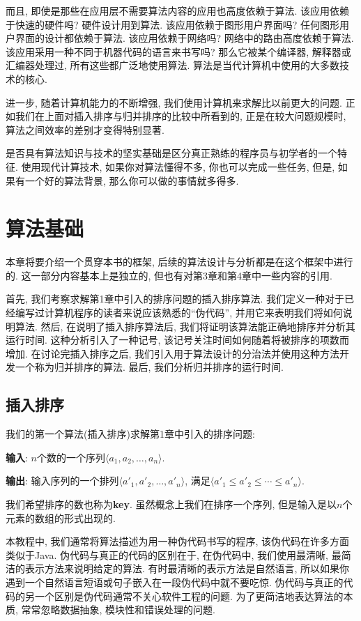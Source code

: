 \documentclass[oneside,10pt]{ctexbook}
\begin{document}
而且, 即使是那些在应用层不需要算法内容的应用也高度依赖于算法. 该应用依赖于快速的硬件吗? 硬件设计用到算法. 该应用依赖于图形用户界面吗? 任何图形用户界面的设计都依赖于算法. 该应用依赖于网络吗? 网络中的路由高度依赖于算法. 该应用采用一种不同于机器代码的语言来书写吗? 那么它被某个编译器, 解释器或汇编器处理过, 所有这些都广泛地使用算法. 算法是当代计算机中使用的大多数技术的核心.

进一步, 随着计算机能力的不断增强, 我们使用计算机来求解比以前更大的问题. 正如我们在上面对插入排序与归并排序的比较中所看到的, 正是在较大问题规模时, 算法之间效率的差别才变得特别显著.

是否具有算法知识与技术的坚实基础是区分真正熟练的程序员与初学者的一个特征. 使用现代计算技术, 如果你对算法懂得不多, 你也可以完成一些任务, 但是, 如果有一个好的算法背景, 那么你可以做的事情就多得多.

\chapter{算法基础}

本章将要介绍一个贯穿本书的框架, 后续的算法设计与分析都是在这个框架中进行的. 这一部分内容基本上是独立的, 但也有对第3章和第4章中一些内容的引用.

首先, 我们考察求解第1章中引入的排序问题的插入排序算法. 我们定义一种对于已经编写过计算机程序的读者来说应该熟悉的``伪代码'', 并用它来表明我们将如何说明算法. 然后, 在说明了插入排序算法后, 我们将证明该算法能正确地排序并分析其运行时间. 这种分析引入了一种记号, 该记号关注时间如何随着将被排序的项数而增加. 在讨论完插入排序之后, 我们引入用于算法设计的分治法并使用这种方法开发一个称为归并排序的算法. 最后, 我们分析归并排序的运行时间.

\section{插入排序}

我们的第一个算法(插入排序)求解第1章中引入的排序问题:

\textbf{输入}: $n$个数的一个序列$\langle a_1, a_2, \dots, a_n\rangle$.

\textbf{输出}: 输入序列的一个排列$\langle a'_1, a'_2, \dots, a'_n\rangle$, 满足$\langle a'_1\leq a'_2\leq\cdots\leq a'_n\rangle$.

我们希望排序的数也称为\textbf{key}. 虽然概念上我们在排序一个序列, 但是输入是以$n$个元素的数组的形式出现的.

本教程中, 我们通常将算法描述为用一种伪代码书写的程序, 该伪代码在许多方面类似于Java. 伪代码与真正的代码的区别在于, 在伪代码中, 我们使用最清晰, 最简洁的表示方法来说明给定的算法. 有时最清晰的表示方法是自然语言, 所以如果你遇到一个自然语言短语或句子嵌入在一段伪代码中就不要吃惊. 伪代码与真正的代码的另一个区别是伪代码通常不关心软件工程的问题. 为了更简洁地表达算法的本质, 常常忽略数据抽象, 模块性和错误处理的问题.
\end{document}

